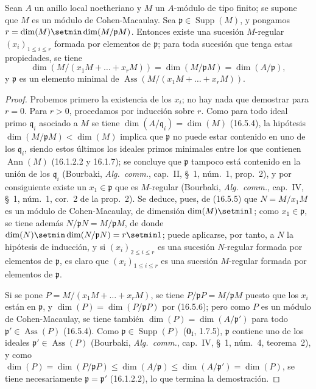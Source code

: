 \begin{proposition}[16.5.9]
\label{0.16.5.9-fr}
Sean $A$ un anillo local noetheriano y $M$ un $A$-módulo de tipo finito; se
supone que $M$ es un módulo de Cohen-Macaulay. Sea
$\mathfrak{p}\in\operatorname{Supp}(M)$, y pongamos
$r=\dim(M)\setmin\dim(M/\mathfrak{p}M)$. Entonces existe una sucesión $M$-regular
$(x_i)_{1\leq i\leq r}$ formada por elementos de $\mathfrak{p}$; para toda
sucesión que tenga estas propiedades, se tiene
\[
  \dim(M/(x_1M+\ldots+x_rM))
  =\dim(M/\mathfrak{p}M)=\dim(A/\mathfrak{p}),
\]
y $\mathfrak{p}$ es un elemento minimal de
$\operatorname{Ass}(M/(x_1M+\ldots+x_rM))$.
\end{proposition}

\begin{proof}
Probemos primero la existencia de los $x_i$; no hay nada que demostrar para
$r=0$. Para $r>0$, procedamos por inducción sobre $r$. Como para todo ideal
primo $\mathfrak{q}_i$ asociado a $M$ se tiene
$\dim(A/\mathfrak{q}_i)=\dim(M)$ (16.5.4), la hipótesis
$\dim(M/\mathfrak{p}M)<\dim(M)$ implica que $\mathfrak{p}$ no puede estar
contenido en uno de los $\mathfrak{q}_i$, siendo estos últimos los ideales primos
minimales entre los que contienen $\operatorname{Ann}(M)$ (16.1.2.2 y
16.1.7); se concluye que $\mathfrak{p}$ tampoco está contenido en la
unión de los $\mathfrak{q}_i$ (Bourbaki, \emph{Alg.~comm.}, cap.~II, \S~1,
núm.~1, prop.~2), y por consiguiente existe un $x_1\in\mathfrak{p}$ que es
$M$-regular (Bourbaki, \emph{Alg.~comm.}, cap.~IV, \S~1, núm.~1, cor.~2 de
la prop.~2). Se deduce, pues, de (16.5.5) que $N=M/x_1M$ es un módulo de
Cohen-Macaulay, de dimensión $\dim(M)\setmin 1$; como $x_1\in\mathfrak{p}$, se tiene
además $N/\mathfrak{p}N=M/\mathfrak{p}M$, de donde
$\dim(N)\setmin\dim(N/\mathfrak{p}N)=r\setmin 1$; puede aplicarse, por tanto, a $N$
la hipótesis de inducción, y si $(x_i)_{2\leq i\leq r}$ es una sucesión
$N$-regular formada por elementos de $\mathfrak{p}$, es claro que
$(x_i)_{1\leq i\leq r}$ es una sucesión $M$-regular formada por elementos de
$\mathfrak{p}$.

Si se pone $P=M/(x_1M+\ldots+x_rM)$, se tiene
$P/\mathfrak{p}P=M/\mathfrak{p}M$ puesto que los $x_i$ están en
$\mathfrak{p}$, y $\dim(P)=\dim(P/\mathfrak{p}P)$ por (16.5.6); pero como
$P$ es un módulo de Cohen-Macaulay, se tiene también
$\dim(P)=\dim(A/\mathfrak{p}')$ para todo
$\mathfrak{p}'\in\operatorname{Ass}(P)$ (16.5.4). Como
$\mathfrak{p}\in\operatorname{Supp}(P)$ ($\mathbf{0}_{\mathrm I}$, 1.7.5),
$\mathfrak{p}$ contiene uno de los ideales
$\mathfrak{p}'\in\operatorname{Ass}(P)$ (Bourbaki, \emph{Alg.~comm.},
cap.~IV, \S~1, núm.~4, teorema~2), y como
$\dim(P)=\dim(P/\mathfrak{p}P)
\leq\dim(A/\mathfrak{p})
\leq\dim(A/\mathfrak{p}')=\dim(P)$,
se tiene necesariamente $\mathfrak{p}=\mathfrak{p}'$ (16.1.2.2), lo que
termina la demostración.
\end{proof}

